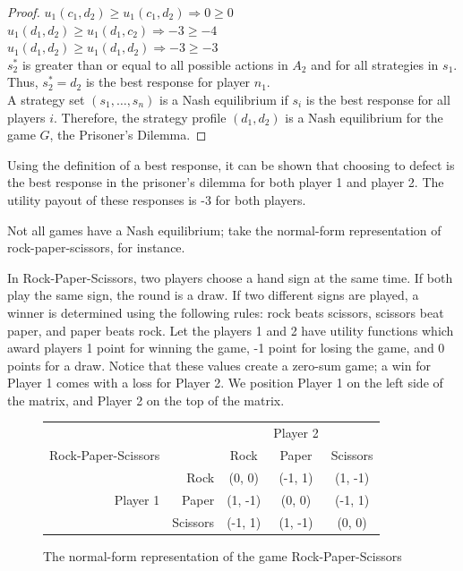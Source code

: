 \begin{proof}
  $u_1(c_1, d_2)\ge u_1(c_1, d_2) \Rightarrow 0\ge 0$\\

  $u_1(d_1, d_2)\ge u_1(d_1, c_2) \Rightarrow -3\ge -4$\\

  $u_1(d_1, d_2)\ge u_1(d_1, d_2) \Rightarrow -3\ge -3$\\

  $s^*_2$ is greater than or equal to all possible actions in $A_2$ and for all strategies in $s_1$. Thus, $s^*_2=d_2$ is the best response for player $n_1$.\\

  A strategy set $(s_1,\dots ,s_n)$ is a Nash equilibrium if $s_i$ is the best response for all players $i$. Therefore, the strategy profile $(d_1, d_2)$ is a Nash equilibrium for the game $G$, the Prisoner's Dilemma.
\end{proof}
Using the definition of a best response, it can be shown that choosing to defect is the best response in the prisoner's dilemma for both player 1 and player 2. The utility payout of these responses is -3 for both players.

Not all games have a Nash equilibrium; take the normal-form representation of rock-paper-scissors, for instance.

\begin{exmp}
  In Rock-Paper-Scissors, two players choose a hand sign at the same time. If both play the same sign, the round is a draw. If two different signs are played, a winner is determined using the following rules: rock beats scissors, scissors beat paper, and paper beats rock. Let the players 1 and 2 have utility functions which award players 1 point for winning the game, -1 point for losing the game, and 0 points for a draw. Notice that these values create a zero-sum game; a win for Player 1 comes with a loss for Player 2. We position Player 1 on the left side of the matrix, and Player 2 on the top of the matrix.
  \begin{figure}[H]
    \centering
    \begin{tabular}{r r | c | c | c |}
      &\multicolumn{1}{c}{}&\multicolumn{1}{c}{}&\multicolumn{1}{c}{Player 2}&\multicolumn{1}{c}{}\\
      Rock-Paper-Scissors &\multicolumn{1}{c}{}&\multicolumn{1}{c}{Rock}&\multicolumn{1}{c}{Paper}&\multicolumn{1}{c}{Scissors} \\ \cline{3-5}
      & Rock & (0, 0) & (-1, 1) & (1, -1) \\ \cline{3-5}
      Player 1 & Paper & (1, -1) & (0, 0) & (-1, 1) \\ \cline{3-5}
      & Scissors & (-1, 1) & (1, -1) & (0, 0) \\ \cline{3-5}
    \end{tabular}
    \caption{The normal-form representation of the game Rock-Paper-Scissors}
    \label{fig:RPS}
  \end{figure}
\end{exmp}


